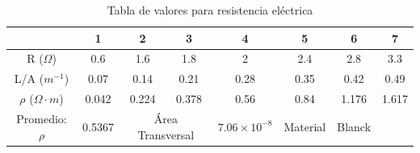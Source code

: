 \documentclass[letterpaper, 12pt]{report}
\begin{document}

\begin{table}[H]
	\centering
	\caption{Tabla de valores para resistencia eléctrica}
	\label{tabla-resistencia 1ra Medicion}
	\begin{tabular}{cccccccc}
		\toprule
		                          & 1      & 2                                    & 3                     & 4        & 5      & 6     & 7     \\
		\midrule
		R ($\Omega$)              & 0.6    & 1.6                                  & 1.8                   & 2        & 2.4    & 2.8   & 3.3   \\
		L/A ($m^{-1}$)            & 0.07   & 0.14                                 & 0.21                  & 0.28     & 0.35   & 0.42  & 0.49  \\
		$\rho$ ($\Omega \cdot m$) & 0.042  & 0.224                                & 0.378                 & 0.56     & 0.84   & 1.176 & 1.617 \\
		Promedio: $\rho$          & 0.5367 & \multicolumn{2}{c}{Área Transversal} & $7.06 \times 10^{-8}$ & Material & Blanck                 \\
		\bottomrule
	\end{tabular}
\end{table}
\end{document}
